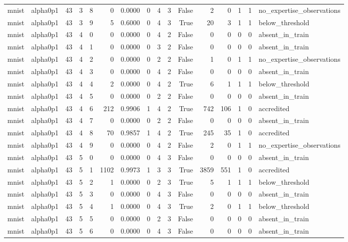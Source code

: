 \begin{tabular}{llrrrrrrrrrrrrrl}
mnist & alpha0p1 & 43 & 3 & 8 & 0 & 0.0000 & 0 & 4 & 3 & False & 2 & 0 & 1 & 1 & no\_expertise\_observations \\
mnist & alpha0p1 & 43 & 3 & 9 & 5 & 0.6000 & 0 & 4 & 3 & True & 20 & 3 & 1 & 1 & below\_threshold \\
mnist & alpha0p1 & 43 & 4 & 0 & 0 & 0.0000 & 0 & 4 & 2 & False & 0 & 0 & 0 & 0 & absent\_in\_train \\
mnist & alpha0p1 & 43 & 4 & 1 & 0 & 0.0000 & 0 & 3 & 2 & False & 0 & 0 & 0 & 0 & absent\_in\_train \\
mnist & alpha0p1 & 43 & 4 & 2 & 0 & 0.0000 & 0 & 2 & 2 & False & 1 & 0 & 1 & 1 & no\_expertise\_observations \\
mnist & alpha0p1 & 43 & 4 & 3 & 0 & 0.0000 & 0 & 4 & 2 & False & 0 & 0 & 0 & 0 & absent\_in\_train \\
mnist & alpha0p1 & 43 & 4 & 4 & 2 & 0.0000 & 0 & 4 & 2 & True & 6 & 1 & 1 & 1 & below\_threshold \\
mnist & alpha0p1 & 43 & 4 & 5 & 0 & 0.0000 & 0 & 2 & 2 & False & 0 & 0 & 0 & 0 & absent\_in\_train \\
mnist & alpha0p1 & 43 & 4 & 6 & 212 & 0.9906 & 1 & 4 & 2 & True & 742 & 106 & 1 & 0 & accredited \\
mnist & alpha0p1 & 43 & 4 & 7 & 0 & 0.0000 & 0 & 2 & 2 & False & 0 & 0 & 0 & 0 & absent\_in\_train \\
mnist & alpha0p1 & 43 & 4 & 8 & 70 & 0.9857 & 1 & 4 & 2 & True & 245 & 35 & 1 & 0 & accredited \\
mnist & alpha0p1 & 43 & 4 & 9 & 0 & 0.0000 & 0 & 4 & 2 & False & 2 & 0 & 1 & 1 & no\_expertise\_observations \\
mnist & alpha0p1 & 43 & 5 & 0 & 0 & 0.0000 & 0 & 4 & 3 & False & 0 & 0 & 0 & 0 & absent\_in\_train \\
mnist & alpha0p1 & 43 & 5 & 1 & 1102 & 0.9973 & 1 & 3 & 3 & True & 3859 & 551 & 1 & 0 & accredited \\
mnist & alpha0p1 & 43 & 5 & 2 & 1 & 0.0000 & 0 & 2 & 3 & True & 5 & 1 & 1 & 1 & below\_threshold \\
mnist & alpha0p1 & 43 & 5 & 3 & 0 & 0.0000 & 0 & 4 & 3 & False & 0 & 0 & 0 & 0 & absent\_in\_train \\
mnist & alpha0p1 & 43 & 5 & 4 & 1 & 0.0000 & 0 & 4 & 3 & True & 2 & 0 & 1 & 1 & below\_threshold \\
mnist & alpha0p1 & 43 & 5 & 5 & 0 & 0.0000 & 0 & 2 & 3 & False & 0 & 0 & 0 & 0 & absent\_in\_train \\
mnist & alpha0p1 & 43 & 5 & 6 & 0 & 0.0000 & 0 & 4 & 3 & False & 0 & 0 & 0 & 0 & absent\_in\_train \\

\end{tabular}
